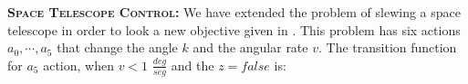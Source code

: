 







{\bf \textsc{Space Telescope Control}:} We have extended the problem of slewing a space telescope
in order to look a new objective given in \cite{DLohr:2012}. This problem has six actions $a_0, \cdots ,a_5$ that change the angle $k$ and the angular rate $v$. The transition function for $a_5$ action, when $v < 1$ $\frac{deg}{seg}$ and the $z= false$ is:

